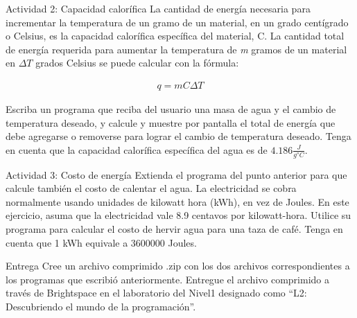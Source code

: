 \documentclass{ip-lab}
\begin{document}
\begin{sectionbox}{Actividad 2: Capacidad calorífica}
La cantidad de energía necesaria para incrementar la temperatura de un gramo de un material, en un grado centígrado o Celsius, es la capacidad calorífica específica del material, C. La cantidad total de energía requerida para aumentar la temperatura de \textit{m} gramos de un material en $\Delta T$ grados Celsius se puede calcular con la fórmula:

\pagebreak  

\begin{gather*}
    q = mC\Delta T
\end{gather*}

Escriba un programa que reciba del usuario una masa de agua y el cambio de temperatura deseado, y calcule y muestre por pantalla el total de energía que debe agregarse o removerse para lograr el cambio de temperatura deseado. Tenga en cuenta que la capacidad calorífica específica del agua es de $4.186 \frac{J}{g°C}$.
\end{sectionbox}

\begin{sectionbox}{Actividad 3: Costo de energía}
Extienda el programa del punto anterior para que calcule también el costo de calentar el agua. La electricidad se cobra normalmente usando unidades de kilowatt hora (kWh), en vez de Joules. En este ejercicio, asuma que la electricidad vale 8.9 centavos por kilowatt-hora. Utilice su programa para calcular el costo de hervir agua para una taza de café. Tenga en cuenta que 1 kWh equivale a 3600000 Joules.
\end{sectionbox}

\begin{sectionbox}{Entrega}
Cree un archivo comprimido .zip con los dos archivos correspondientes a los programas que escribió anteriormente. Entregue el archivo comprimido a través de Brightspace en el laboratorio del Nivel1 designado como ``L2: Descubriendo el mundo de la programación''.
\end{sectionbox}
\end{document}
